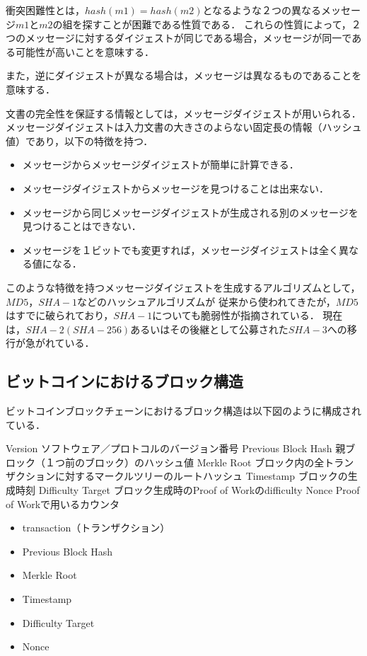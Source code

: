 \documentclass[a4paper,12pt]{jsarticle}
\begin{document}
衝突困難性とは，$hash(m1)= hash(m2)$となるような２つの異なるメッセージ$m1$と$m2$の組を探すことが困難である性質である．
これらの性質によって，２つのメッセージに対するダイジェストが同じである場合，メッセージが同一である可能性が高いことを意味する．

また，逆にダイジェストが異なる場合は，メッセージは異なるものであることを意味する．

文書の完全性を保証する情報としては，メッセージダイジェストが用いられる．
メッセージダイジェストは入力文書の大きさのよらない固定長の情報（ハッシュ値）であり，以下の特徴を持つ．

\begin{itemize}
  \item メッセージからメッセージダイジェストが簡単に計算できる．
  \item メッセージダイジェストからメッセージを見つけることは出来ない．
  \item メッセージから同じメッセージダイジェストが生成される別のメッセージを見つけることはできない．
  \item メッセージを１ビットでも変更すれば，メッセージダイジェストは全く異なる値になる．
\end{itemize}

このような特徴を持つメッセージダイジェストを生成するアルゴリズムとして，$MD5$，$SHA-1$などのハッシュアルゴリズムが
従来から使われてきたが，$MD5$はすでに破られており，$SHA-1$についても脆弱性が指摘されている．
現在は，$SHA-2(SHA-256)$あるいはその後継として公募された$SHA-3$への移行が急がれている．

\subsection*{ビットコインにおけるブロック構造}
ビットコインブロックチェーンにおけるブロック構造は以下図のように構成されている．

	Version	ソフトウェア／プロトコルのバージョン番号
	Previous Block Hash	親ブロック（１つ前のブロック）のハッシュ値
	Merkle Root	ブロック内の全トランザクションに対するマークルツリーのルートハッシュ
	Timestamp	ブロックの生成時刻
	Difficulty Target	ブロック生成時のProof of Workのdifficulty
	Nonce	Proof of Workで用いるカウンタ
\begin{itemize}
    \item transaction（トランザクション）
    \item Previous Block Hash
    \item Merkle Root
    \item Timestamp
    \item Difficulty Target
    \item Nonce
\end{itemize}
\end{document}

